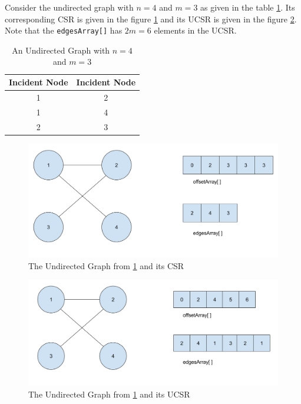 \documentclass[MTech]{iitmdiss}
\begin{document}
Consider the undirected graph with $n=4$ and $m=3$ as given in the table \ref{table:2}. Its corresponding CSR is given in the figure \ref{fig:csru} and its UCSR is given in the figure \ref{fig:csrun}. Note that the \verb+edgesArray[]+ has $2m = 6$ elements in the UCSR.

\begin{table}[h!]
\centering
\begin{tabular}{||c|c||} 
 \hline
 Incident Node & Incident Node \\ [0.5ex] 
 \hline\hline
 1 & 2\\
 \hline
 1 & 4\\
 \hline
 2 & 3\\
 \hline
\end{tabular}
\caption{An Undirected Graph with $n=4$ and $m=3$}
\label{table:2}
\end{table}

\begin{figure}[h]
    \centering
    \includegraphics[width=\textwidth,scale=0.6,keepaspectratio=true]{csrundirected.jpg}
    \caption{
        The Undirected Graph from \ref{table:2} and its CSR
    }
    \label{fig:csru}
\end{figure}
\begin{figure}[h]
    \centering
    \includegraphics[width=\textwidth,scale=0.6,keepaspectratio=true]{csrundirectednew.jpg}
    \caption{
        The Undirected Graph from \ref{table:2} and its UCSR
    }
    \label{fig:csrun}
\end{figure}
\end{document}
